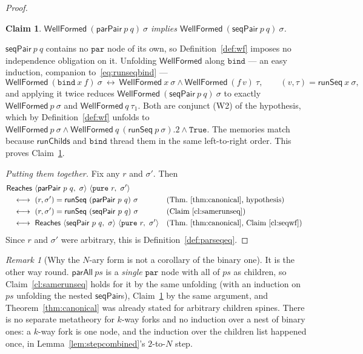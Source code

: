 \documentclass[11pt,a4paper]{article}
\theoremstyle{definition}
\theoremstyle{plain}
\newtheorem{claim}[definition]{Claim}
\theoremstyle{remark}
\newtheorem{remark}[definition]{Remark}
\newcommand{\st}{\sigma}
\newcommand{\runSeq}{\mathsf{runSeq}}
\newcommand{\wf}{\mathsf{WellFormed}}
\newcommand{\Reaches}{\mathsf{Reaches}}
\begin{document}
\begin{proof}
\begin{claim}\label{cl:seqwf}
$\wf\ (\mathsf{parPair}\ p\ q)\ \st$ implies $\wf\ (\mathsf{seqPair}\ p\ q)\ \st$.
\end{claim}

$\mathsf{seqPair}\ p\ q$ contains no $\texttt{par}$ node of its own, so
Definition~\ref{def:wf} imposes no independence obligation on it. Unfolding $\wf$ along
$\texttt{bind}$ --- an easy induction, companion to~\eqref{eq:runseqbind} ---
\[
  \wf\ (\texttt{bind}\ x\ f)\ \st \ \longleftrightarrow\ \wf\ x\ \st \wedge \wf\ (f\,v)\ \tau,
  \qquad (v,\tau) = \runSeq\ x\ \st ,
\]
and applying it twice reduces $\wf\ (\mathsf{seqPair}\ p\ q)\ \st$ to exactly
$\wf\ p\ \st$ and $\wf\ q\ \tau_1$. Both are conjunct (W2) of the hypothesis, which by
Definition~\ref{def:wf} unfolds to
$\wf\ p\ \st \wedge \wf\ q\ (\runSeq\ p\ \st).2 \wedge \mathtt{True}$. The memories match
because $\mathsf{runChilds}$ and $\texttt{bind}$ thread them in the same left-to-right order.
This proves Claim~\ref{cl:seqwf}.

\emph{Putting them together.} Fix any $r$ and $\st'$. Then
\begin{align*}
  &\Reaches\ \langle \mathsf{parPair}\ p\ q,\ \st\rangle\ \langle \texttt{pure}\ r,\ \st'\rangle \\
  &\quad \longleftrightarrow\ (r,\st') = \runSeq\ (\mathsf{parPair}\ p\ q)\ \st
      && \text{(Thm.~\ref{thm:canonical}, hypothesis)} \\
  &\quad \longleftrightarrow\ (r,\st') = \runSeq\ (\mathsf{seqPair}\ p\ q)\ \st
      && \text{(Claim~\ref{cl:samerunseq})} \\
  &\quad \longleftrightarrow\ \Reaches\ \langle \mathsf{seqPair}\ p\ q,\ \st\rangle\ \langle \texttt{pure}\ r,\ \st'\rangle
      && \text{(Thm.~\ref{thm:canonical}, Claim~\ref{cl:seqwf})}
\end{align*}
Since $r$ and $\st'$ were arbitrary, this is Definition~\ref{def:parseqeq}.
\end{proof}

\begin{remark}[Why the $N$-ary form is not a corollary of the binary one]
It is the other way round. $\mathsf{parAll}\ ps$ is a \emph{single} $\texttt{par}$ node with
all of $ps$ as children, so Claim~\ref{cl:samerunseq} holds for it by the same unfolding
(with an induction on $ps$ unfolding the nested $\mathsf{seqPair}$s), Claim~\ref{cl:seqwf} by
the same argument, and Theorem~\ref{thm:canonical} was already stated for arbitrary children
spines. There is no separate metatheory for $k$-way forks and no induction over a nest of
binary ones: a $k$-way fork is one node, and the induction over the children list happened
once, in Lemma~\ref{lem:stepcombined}'s $2$-to-$N$ step.
\end{remark}
\end{document}
